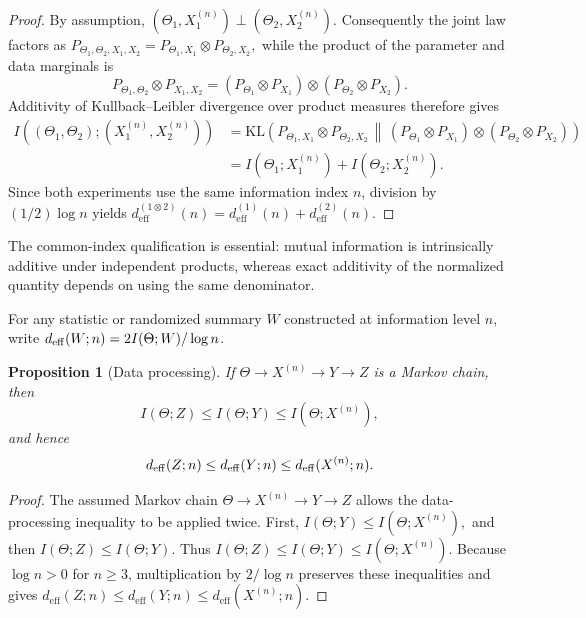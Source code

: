 \documentclass[11pt]{article}
\theoremstyle{plain}
\newtheorem{proposition}{Proposition}
\theoremstyle{definition}
\theoremstyle{remark}
\newcommand{\KL}{\mathrm{KL}}
\begin{document}
\begin{proof}
	By assumption,
	\(
	(\Theta_1,X_1^{(n)})
	\perp
	(\Theta_2,X_2^{(n)}).
	\)
	Consequently the joint law factors as
	\(
	P_{\Theta_1,\Theta_2,X_1,X_2}
	=
	P_{\Theta_1,X_1}\otimes P_{\Theta_2,X_2},
	\)
	while the product of the parameter and data marginals is
	\[
	P_{\Theta_1,\Theta_2}\otimes P_{X_1,X_2}
	=
	(P_{\Theta_1}\otimes P_{X_1})
	\otimes
	(P_{\Theta_2}\otimes P_{X_2}).
	\]
	Additivity of Kullback--Leibler divergence over product measures therefore gives
	\[
	\begin{aligned}
		I\!\left(
		(\Theta_1,\Theta_2);
		(X_1^{(n)},X_2^{(n)})
		\right)
		&=
		\KL\!\left(
		P_{\Theta_1,X_1}\otimes P_{\Theta_2,X_2}
		\,\middle\|\,
		(P_{\Theta_1}\otimes P_{X_1})
		\otimes
		(P_{\Theta_2}\otimes P_{X_2})
		\right)\\
		&=
		I(\Theta_1;X_1^{(n)})
		+
		I(\Theta_2;X_2^{(n)}).
	\end{aligned}
	\]
	Since both experiments use the same information index \(n\), division by
	\((1/2)\log n\) yields
	\(
	d_{\mathrm{eff}}^{(1\otimes2)}(n)
	=
	d_{\mathrm{eff}}^{(1)}(n)
	+
	d_{\mathrm{eff}}^{(2)}(n).
	\)
\end{proof}


The common-index qualification is essential: mutual information is intrinsically additive under independent products, whereas exact additivity of the normalized quantity depends on using the same denominator.

For any statistic or randomized summary $W$ constructed at information level $n$, write $d_{\rm eff}(W;n)=2I(\Theta;W)/\log n$.

\begin{proposition}[Data processing]
	\label{prop:data-processing}
	If $\Theta\to X^{(n)}\to Y\to Z$ is a Markov chain, then
	\[
	I(\Theta;Z)\leq I(\Theta;Y)\leq I(\Theta;X^{(n)}),
	\]
	and hence
	\[
	d_{\rm eff}(Z;n)
	\leq
	d_{\rm eff}(Y;n)
	\leq
	d_{\rm eff}(X^{(n)};n).
	\]
\end{proposition}

\begin{proof}
	The assumed Markov chain
	\(
	\Theta\longrightarrow X^{(n)}\longrightarrow Y\longrightarrow Z
	\)
	allows the data-processing inequality to be applied twice. First,
	\(
	I(\Theta;Y)\leq I(\Theta;X^{(n)}),
	\)
	and then
	\(
	I(\Theta;Z)\leq I(\Theta;Y).
	\)
	Thus
	\(
	I(\Theta;Z)
	\leq
	I(\Theta;Y)
	\leq
	I(\Theta;X^{(n)}).
	\)
	Because \(\log n>0\) for \(n\geq3\), multiplication by \(2/\log n\) preserves these inequalities and gives
	\(
	d_{\mathrm{eff}}(Z;n)
	\leq
	d_{\mathrm{eff}}(Y;n)
	\leq
	d_{\mathrm{eff}}(X^{(n)};n).
	\)
\end{proof}
\end{document}
